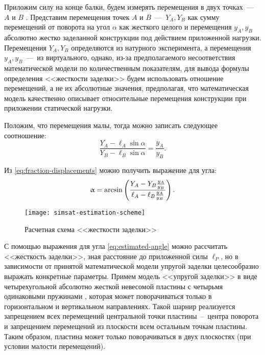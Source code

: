 Приложим силу на конце балки, будем измерять перемещения в двух точках~---~$ A $ и $ B $ . Представим перемещения точек $ A $ и $ B $~---~$ Y_A, Y_B $ как сумму перемещений от поворота на угол $ \alpha $ как жесткого целого и перемещения $ y_A, y_B $ абсолютно жестко заделанной конструкции под действием приложенной нагрузки. Перемещения $ Y_A, Y_B $ определяются из натурного эксперимента, а перемещения $ y_A, y_B $~---~из виртуального, однако, из-за предполагаемого несоответствия математической модели по количественным показателям, для вывода формулы определения <<жесткости заделки>> будем использовать отношение перемещений, а не их абсолютные значения, предполагая, что математическая модель качественно описывает относительные перемещения конструкции при приложении статической нагрузки.

Положим, что перемещения малы, тогда можно записать следующее соотношение:
\begin{equation}
	\frac{Y_A - \ell_A \sin \alpha}{Y_B - \ell_B \sin \alpha} = \frac{y_A}{y_B}.
	\label{eq:fraction-displacements}
\end{equation}

Из \eqref{eq:fraction-displacements} можно получить выражение для угла:
\begin{equation}
	\upalpha = \arcsin \left( \frac{Y_A - Y_B \frac{y_A}{y_B}}{\ell_A - \ell_B \frac{y_A}{y_B}} \right).
	\label{eq:estimated-angle}
\end{equation}

\begin{figure}[!htb]
	\centerfloat
	\texttt{[image: simsat-estimation-scheme]}
	\caption{Расчетная схема <<жесткости заделки>>} \label{fig:simsat-estimation-scheme}
\end{figure}

С помощью выражения для угла \eqref{eq:estimated-angle} можно рассчитать <<жесткость заделки>>, зная расстояние до приложенной силы $ \ell_P $, но в зависимости от принятой математической модели упругой заделки целесообразно выражать конкретные параметры. Примем модель <<упругой заделки>> в виде четырехугольной абсолютно жесткой невесомой пластины с четырьмя одинаковыми пружинами , которая может поворачиваться только в горизонтальном и вертикальном направлениях. Такой шарнир реализуется запрещением всех перемещений центральной точки пластины~--~центра поворота и запрещением перемещений из плоскости всем остальным точкам пластины. Таким образом, пластина может только поворачиваться в двух плоскостях (при условии малости перемещений).

